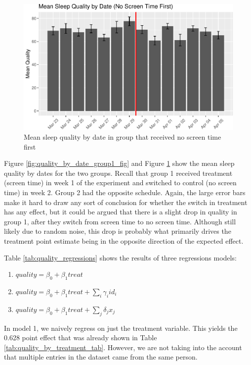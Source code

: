 \documentclass[12pt,]{article}
\providecommand{\tightlist}{%
  \setlength{\itemsep}{0pt}\setlength{\parskip}{0pt}}
\begin{document}
\begin{figure}
\centering
\includegraphics{report_files/figure-latex/quality_by_date_group2_fig-1.pdf}
\caption{\label{fig:quality_by_date_group2_fig} Mean sleep quality by
date in group that received no screen time first}
\end{figure}

Figure \ref{fig:quality_by_date_group1_fig} and Figure
\ref{fig:quality_by_date_group2_fig} show the mean sleep quality by
dates for the two groups. Recall that group 1 received treatment (screen
time) in week 1 of the experiment and switched to control (no screen
time) in week 2. Group 2 had the opposite schedule. Again, the large
error bars make it hard to draw any sort of conclusion for whether the
switch in treatment has any effect, but it could be argued that there is
a slight drop in quality in group 1, after they switch from screen time
to no screen time. Although still likely due to random noise, this drop
is probably what primarily drives the treatment point estimate being in
the opposite direction of the expected effect.

Table \ref{tab:quality_regressions} shows the results of three
regressions models:

\begin{enumerate}
\def\labelenumi{\arabic{enumi}.}
\tightlist
\item
  \(quality = \beta_0 + \beta_1 treat\)
\item
  \(quality = \beta_0 + \beta_1 treat + \sum_i \gamma_i id_i\)
\item
  \(quality = \beta_0 + \beta_1 treat + \sum_j \delta_j x_j\)
\end{enumerate}

In model 1, we naively regress on just the treatment variable. This
yields the 0.628 point effect that was already shown in Table
\ref{tab:quality_by_treatment_tab}. However, we are not taking into the
account that multiple entries in the dataset came from the same person.
\end{document}
